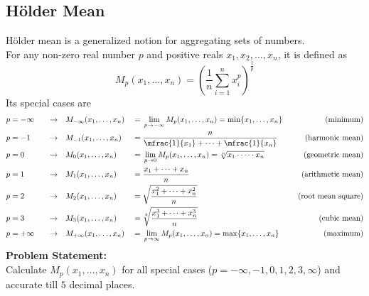 \documentclass[../../Problems]{subfiles}
\begin{document}
\subsection{H\"older Mean}
H\"older mean is a generalized notion for aggregating sets of numbers.\\
For any non-zero real number $p$ and positive reals $x_1, x_2,\ldots,x_n$, it is defined as
\begin{equation}
{\displaystyle M_{p}(x_{1},\ldots,x_{n})=\left({\frac {1}{n}}\sum _{i=1}^{n}x_{i}^{p}\right)^{\frac {1}{p}}}
\end{equation}
Its special cases are
\begin{equation}
	\begin{aligned}
		p & = -\infty \quad & \rightarrow & \quad M_{-\infty}(x_1,\dots,x_n)       & {}={} & \lim_{p\to-\infty} M_p(x_1,\dots,x_n) = \min \{x_1,\dots,x_n\}                     & \quad\text{(minimum)}\\
		p & = -1 \quad      & \rightarrow & \quad M_{-1}(x_{1},\dots ,x_{n})       & {}={} & {\frac {n}{{\mfrac {1}{x_{1}}}+\dots +{\mfrac {1}{x_{n}}}}}                        & \quad\text{(harmonic mean)}\\
		p & = 0 \quad       & \rightarrow & \quad M_{0}(x_{1},\dots ,x_{n})        & {}={} & \lim _{p\to 0}M_{p}(x_{1},\dots ,x_{n})={\sqrt[{n}]{x_{1}\cdot \dots \cdot x_{n}}} & \quad\text{(geometric mean)}\\
		p & = 1 \quad       & \rightarrow & \quad M_{1}(x_{1},\dots ,x_{n})        & {}={} & {\frac {x_{1}+\dots +x_{n}}{n}}                                                    & \quad\text{(arithmetic mean)}\\
		p & = 2 \quad       & \rightarrow & \quad M_{2}(x_{1},\dots ,x_{n})        & {}={} & {\sqrt {\frac {x_{1}^{2}+\dots +x_{n}^{2}}{n}}}                                    & \quad\text{(root mean square)}\\
		p & = 3 \quad       & \rightarrow & \quad M_{3}(x_{1},\dots ,x_{n})        & {}={} & {\sqrt[{3}]{\frac {x_{1}^{3}+\dots +x_{n}^{3}}{n}}}                                & \quad\text{(cubic mean)}\\
		p & = +\infty \quad & \rightarrow & \quad M_{+\infty }(x_{1},\dots ,x_{n}) & {}={} & \lim _{p\to \infty }M_{p}(x_{1},\dots ,x_{n})=\max\{x_{1},\dots ,x_{n}\}           & \quad\text{(maximum)}
	\end{aligned}
\end{equation}
\textbf{Problem Statement:}\\
Calculate $M_{p}(x_{1},\dots ,x_{n})$ for all special cases ($p=-\infty, -1, 0, 1, 2, 3, \infty$) and accurate till $5$ decimal places.
\end{document}
